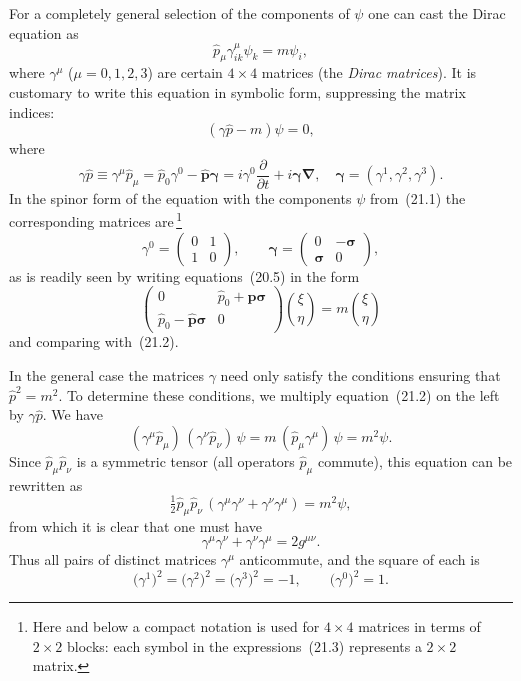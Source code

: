 For a completely general selection of the components of $\psi$ one can cast the Dirac equation as
\[
\widehat p_\mu\gamma^{\mu}_{ik}\psi_k = m\psi_i,
\]
where $\gamma^\mu$ ($\mu = 0, 1, 2, 3$) are certain $4\times 4$ matrices (the \emph{Dirac matrices}). It is customary to write this equation in symbolic form, suppressing the matrix indices:
\begin{equation}
(\gamma\widehat p - m)\psi = 0,
\tag{21.2}
\end{equation}
where
\[
\gamma\widehat p \equiv \gamma^\mu\widehat p_\mu = \widehat p_0\gamma^0 - \widehat{\mathbf{p}}\boldsymbol{\gamma} = i\gamma^0\frac{\partial}{\partial t} + i\boldsymbol{\gamma}\boldsymbol{\nabla},\quad \boldsymbol{\gamma} = (\gamma^1, \gamma^2, \gamma^3).
\]
In the spinor form of the equation with the components $\psi$ from~(21.1) the corresponding matrices are\,\footnote{Here and below a compact notation is used for $4\times 4$ matrices in terms of $2\times 2$ blocks: each symbol in the expressions~(21.3) represents a $2\times 2$ matrix.}
\begin{equation}
\gamma^0 = \begin{pmatrix} 0 & 1\\ 1 & 0 \end{pmatrix},\qquad \boldsymbol{\gamma} = \begin{pmatrix} 0 & -\boldsymbol{\sigma}\\ \boldsymbol{\sigma} & 0 \end{pmatrix},
\tag{21.3}
\end{equation}
as is readily seen by writing equations~(20.5) in the form
\[
\begin{pmatrix} 0 & \widehat p_0 + \widehat{\mathbf{p}}\boldsymbol{\sigma}\\ \widehat p_0 - \widehat{\mathbf{p}}\boldsymbol{\sigma} & 0 \end{pmatrix}\binom{\xi}{\eta} = m\binom{\xi}{\eta}
\]
and comparing with~(21.2).

In the general case the matrices $\gamma$ need only satisfy the conditions ensuring that $\widehat p^2 = m^2$. To determine these conditions, we multiply equation~(21.2) on the left by $\gamma\widehat p$. We have
\[
(\gamma^\mu\widehat p_\mu)\,(\gamma^\nu\widehat p_\nu)\,\psi = m\,(\widehat p_\mu\gamma^\mu)\,\psi = m^2\psi.
\]
Since $\widehat p_\mu\widehat p_\nu$ is a symmetric tensor (all operators $\widehat p_\mu$ commute), this equation can be rewritten as
\[
\tfrac{1}{2}\widehat p_\mu\widehat p_\nu\,(\gamma^\mu\gamma^\nu + \gamma^\nu\gamma^\mu) = m^2\psi,
\]
from which it is clear that one must have
\begin{equation}
\gamma^\mu\gamma^\nu + \gamma^\nu\gamma^\mu = 2g^{\mu\nu}.
\tag{21.4}
\end{equation}
Thus all pairs of distinct matrices $\gamma^\mu$ anticommute, and the square of each is
\begin{equation}
\bigl(\gamma^1\bigr)^2 = \bigl(\gamma^2\bigr)^2 = \bigl(\gamma^3\bigr)^2 = -1,\qquad \bigl(\gamma^0\bigr)^2 = 1.
\tag{21.5}
\end{equation}

